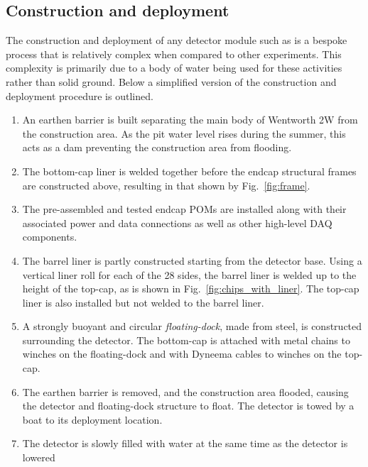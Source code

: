 \subsection{Construction and deployment} %
\label{sec:chips_detector_deployment} %

The construction and deployment of any \chips detector module such as \chipsfive is a bespoke
process that is relatively complex when compared to other experiments. This complexity is
primarily due to a body of water being used for these activities rather than solid ground. Below a
simplified version of the \chipsfive construction and deployment procedure is outlined.

\begin{enumerate}
    \item An earthen barrier is built separating the main body of Wentworth 2W from the
          construction area. As the pit water level rises during the summer, this acts as a dam
          preventing the construction area from flooding.
    \item The bottom-cap liner is welded together before the endcap structural frames are
          constructed above, resulting in that shown by Fig.~\ref{fig:frame}.
    \item The pre-assembled and tested endcap POMs are installed along with their associated power
          and data connections as well as other high-level DAQ components.
    \item The barrel liner is partly constructed starting from the detector base. Using a vertical
          liner roll for each of the 28 sides, the barrel liner is welded up to the height of the
          top-cap, as is shown in Fig.~\ref{fig:chips_with_liner}. The top-cap liner is also
          installed but not welded to the barrel liner.
    \item A strongly buoyant and circular \emph{floating-dock}, made from steel, is constructed
          surrounding the detector. The bottom-cap is attached with metal chains to winches on the
          floating-dock and with Dyneema cables to winches on the top-cap.
    \item The earthen barrier is removed, and the construction area flooded, causing the detector
          and floating-dock structure to float. The detector is towed by a boat to its deployment
          location.
    \item The detector is slowly filled with water at the same time as the detector is lowered

\end{enumerate}
